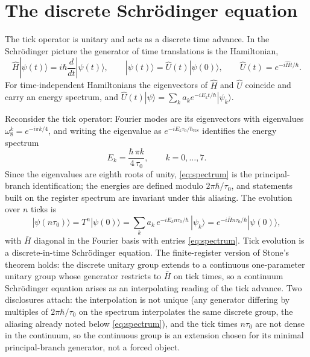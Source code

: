 \documentclass[11pt,letterpaper]{article}
\begin{document}
\section{The discrete Schr\"odinger equation}
\label{sec:schrodinger}

The tick operator is unitary and acts as a discrete time advance. In the Schr\"odinger picture the generator of time translations is the Hamiltonian,
\begin{equation}
\hat{H}|\psi(t)\rangle=i\hbar\frac{d}{dt}|\psi(t)\rangle,\qquad |\psi(t)\rangle=\hat{U}(t)|\psi(0)\rangle,\qquad \hat{U}(t)=e^{-i\hat{H}t/\hbar}.
\label{eq:schr}
\end{equation}
For time-independent Hamiltonians the eigenvectors of $\hat{H}$ and $\hat{U}$ coincide and carry an energy spectrum, and $\hat{U}(t)|\psi\rangle=\sum_{k}a_{k}e^{-iE_{k}t/\hbar}|\psi_{k}\rangle$.

Reconsider the tick operator: Fourier modes are its eigenvectors with eigenvalues $\omega_{8}^{k}=e^{-i\pi k/4}$, and writing the eigenvalue as $e^{-iE_{k}\tau_{0}/\hbar_{\mathrm{RS}}}$ identifies the energy spectrum
\begin{equation}
E_{k}=\frac{\hbar\,\pi k}{4\,\tau_{0}},\qquad k=0,\ldots,7.
\label{eq:spectrum}
\end{equation}
Since the eigenvalues are eighth roots of unity, \eqref{eq:spectrum} is the principal-branch identification; the energies are defined modulo $2\pi\hbar/\tau_{0}$, and statements built on the register spectrum are invariant under this aliasing. The evolution over $n$ ticks is
\begin{equation}
|\psi(n\tau_{0})\rangle=T^{n}|\psi(0)\rangle=\sum_{k}a_{k}\,e^{-iE_{k}n\tau_{0}/\hbar}\,|\psi_{k}\rangle=e^{-i\bar{H}n\tau_{0}/\hbar}|\psi(0)\rangle,
\label{eq:tickevo}
\end{equation}
with $\bar{H}$ diagonal in the Fourier basis with entries \eqref{eq:spectrum}. Tick evolution is a discrete-in-time Schr\"odinger equation. The finite-register version of Stone's theorem holds: the discrete unitary group extends to a continuous one-parameter unitary group whose generator restricts to $\bar{H}$ on tick times, so a continuum Schr\"odinger equation arises as an interpolating reading of the tick advance. Two disclosures attach: the interpolation is not unique (any generator differing by multiples of $2\pi\hbar/\tau_{0}$ on the spectrum interpolates the same discrete group, the aliasing already noted below \eqref{eq:spectrum}), and the tick times $n\tau_{0}$ are not dense in the continuum, so the continuous group is an extension chosen for its minimal principal-branch generator, not a forced object.
\end{document}
